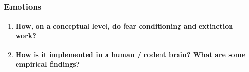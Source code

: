 \documentclass[12pt,article,oneside,a4paper]{memoir}
\begin{document}
\subsubsection{Emotions}
\begin{enumerate}
\item \paragraph{How, on a conceptual level, do fear conditioning and extinction work?}
\item \paragraph{How is it implemented in a human / rodent brain?  What are some empirical findings?}
\end{enumerate}
\end{document}
